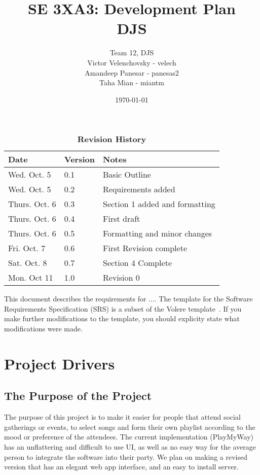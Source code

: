 \documentclass[12pt, titlepage]{article}
\title{SE 3XA3: Development Plan\\DJS}
\author{Team 12, DJS
	\\ Victor Velenchovsky - velech
	\\ Amandeep Panesar - panesas2
	\\ Taha Mian - miantm
}
\date{\today}
\begin{document}
\maketitle

\tableofcontents
\listoftables
\listoffigures

\begin{table}[bp]
\caption{\bf Revision History}
\begin{tabularx}{\textwidth}{p{3cm}p{2cm}X}
\toprule {\bf Date} & {\bf Version} & {\bf Notes}\\
\midrule
Wed. Oct. 5 & 0.1 & Basic Outline \\
Wed. Oct. 5 & 0.2 & Requirements added \\
Thurs. Oct. 6 & 0.3 & Section 1 added and formatting \\
Thurs. Oct. 6 & 0.4 & First draft \\
Thurs. Oct. 6 & 0.5 & Formatting and minor changes \\
Fri. Oct. 7 & 0.6 & First Revision complete \\
Sat. Oct. 8 & 0.7 & Section 4 Complete\\
Mon. Oct 11 & 1.0 & Revision 0\\
\bottomrule
\end{tabularx}
\end{table}

\newpage


This document describes the requirements for ....  The template for the Software
Requirements Specification (SRS) is a subset of the Volere
template~\citep{RobertsonAndRobertson2012}.  If you make further modifications
to the template, you should explicity state what modifications were made.

\section{Project Drivers}

\subsection{The Purpose of the Project}
The purpose of this project is to make it easier for people that attend social
gatherings or events, to select songs and form their own playlist according to
the mood or preference of the attendees. The current implementation (PlayMyWay)
has an unflattering and difficult to use UI, as well as no easy way for the
average person to integrate the software into their party. We plan on making a
revised version that has an elegant web app interface, and an easy to install
server.
\end{document}
